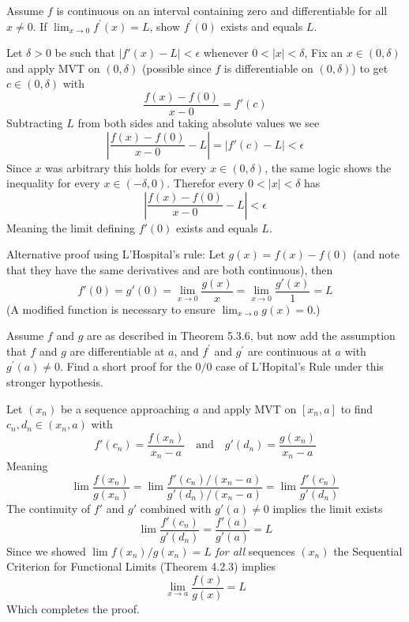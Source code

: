 \begin{exercise}
  Assume $f$ is continuous on an interval containing zero and differentiable for all $x \neq 0$. If $\lim _{x \rightarrow 0} f^{\prime}(x)=L$, show $f^{\prime}(0)$ exists and equals $L$.
\end{exercise}
\begin{solution}
  Let $\delta > 0$ be such that $|f'(x) - L| < \epsilon$ whenever $0<|x|<\delta$,
  Fix an $x \in (0,\delta)$ and apply MVT on $(0,\delta)$ (possible since $f$ is differentiable on $(0,\delta)$) to get $c \in (0,\delta)$ with
  $$
  \frac{f(x) - f(0)}{x - 0} = f'(c)
  $$
  Subtracting $L$ from both sides and taking absolute values we see
  $$
  \left|\frac{f(x) - f(0)}{x - 0} - L\right| = \left|f'(c) - L\right| < \epsilon
  $$
  Since $x$ was arbitrary this holds for every $x \in (0,\delta)$, the same logic shows the inequality for every $x \in (-\delta,0)$. Therefor every $0 < |x| < \delta$ has
  $$
  \left|\frac{f(x) - f(0)}{x - 0} - L\right| < \epsilon
  $$
  Meaning the limit defining $f'(0)$ exists and equals $L$.

  Alternative proof using L'Hospital's rule: Let \(g(x) = f(x) - f(0)\) (and note that they have the same derivatives and are both continuous), then
  \[f'(0) = g'(0) = \lim_{x \to 0} \frac{g(x)}{x} = \lim_{x \to 0}\frac{g'(x)}{1} = L\]
  (A modified function is necessary to ensure \(\lim_{x \to 0} g(x) = 0\).)
\end{solution}

\begin{exercise}
  Assume $f$ and $g$ are as described in Theorem 5.3.6, but now add the assumption that $f$ and $g$ are differentiable at $a$, and $f^{\prime}$ and $g^{\prime}$ are continuous at $a$ with $g^{\prime}(a) \neq 0$. Find a short proof for the $0 / 0$ case of L'Hopital's Rule under this stronger hypothesis.
\end{exercise}
\begin{solution}
  Let $(x_n)$ be a sequence approaching $a$ and apply MVT on $[x_n,a]$ to find $c_n,d_n \in (x_n,a)$ with
  $$
  f'(c_n) = \frac{f(x_n)}{x_n - a} \quad\text{and}\quad g'(d_n) = \frac{g(x_n)}{x_n - a}
  $$
  Meaning
  $$
  \lim \frac{f(x_n)}{g(x_n)} = \lim \frac{f'(c_n)/(x_n-a)}{g'(d_n)/(x_n-a)} = \lim \frac{f'(c_n)}{g'(d_n)}
  $$
  The continuity of $f'$ and $g'$ combined with $g'(a) \ne 0$ implies the limit exists
  $$
  \lim \frac{f'(c_n)}{g'(d_n)} = \frac{f'(a)}{g'(a)} = L
  $$
  Since we showed $\lim f(x_n)/g(x_n) = L$ \emph{for all} sequences $(x_n)$ the Sequential Criterion for Functional Limits (Theorem 4.2.3) implies
  $$
  \lim_{x \to a} \frac{f(x)}{g(x)} = L
  $$
  Which completes the proof.
\end{solution}

